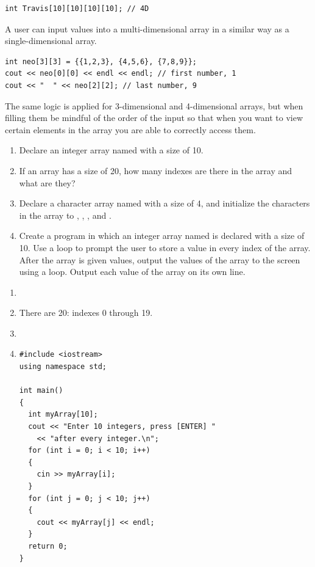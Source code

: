 \noindent\begin{minipage}{\linewidth}\begin{lstlisting}
int Travis[10][10][10][10]; // 4D
\end{lstlisting}\end{minipage}

A user can input values into a multi-dimensional array in a similar way as a single-dimensional array. 

\noindent\begin{minipage}{\linewidth}\begin{lstlisting}
int neo[3][3] = {{1,2,3}, {4,5,6}, {7,8,9}}; 
cout << neo[0][0] << endl << endl; // first number, 1
cout << "  " << neo[2][2]; // last number, 9
\end{lstlisting}\end{minipage}


The same logic is applied for 3-dimensional and 4-dimensional arrays, but when filling them be mindful of the order of the input so that when you want to view certain elements in the array you are able to correctly access them. 


\begin{enumerate}
	\item Declare an integer array named  with a size of 10.
  \item If an array has a size of 20, how many indexes are there in the array and what are they?
  \item Declare a character array named  with a size of 4, and initialize the characters in the array to , , , and . 
  \item 
  Create a program in which an integer array named  is declared with a size of 10. 
  Use a  loop to prompt the user to store a value in every index of the array. 
  After the array is given values, output the values of the array to the screen using a  loop. 
  Output each value of the array on its own line.
\end{enumerate}


\begin{enumerate}
	\item {}
  \item There are 20: indexes 0 through 19.
  \item {}
  \item 
\noindent\begin{minipage}{\linewidth}\begin{lstlisting}
#include <iostream>
using namespace std;

int main()
{
  int myArray[10];
  cout << "Enter 10 integers, press [ENTER] "
    << "after every integer.\n";
  for (int i = 0; i < 10; i++)
  {
    cin >> myArray[i];
  }
  for (int j = 0; j < 10; j++)
  {
    cout << myArray[j] << endl;
  }
  return 0;
}
\end{lstlisting}\end{minipage}
\end{enumerate}


